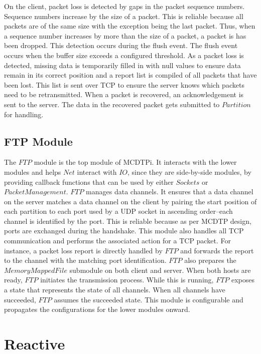 On the client, packet loss is detected by gaps in the packet sequence numbers. Sequence numbers increase by the size of a packet. This is reliable because all packets are of the same size with the exception being the last packet. Thus, when a sequence number increases by more than the size of a packet, a packet is has been dropped. This detection occurs during the flush event. The flush event occurs when the buffer size exceeds a configured threshold. As a packet loss is detected, missing data is temporarily filled in with null values to ensure data remain in its correct position and a report list is compiled of all packets that have been lost. This list is sent over TCP to ensure the server knows which packets need to be retransmitted. When a packet is recovered, an acknowledgement is sent to the server. The data in the recovered packet gets submitted to $Partition$ for handling.

\subsection{FTP Module}

The $FTP$ module is the top module of MCDTPi. It interacts with the lower modules and helps $Net$ interact with $IO$, since they are side-by-side modules, by providing callback functions that can be used by either $Sockets$ or $PacketManagement$. $FTP$ manages data channels. It ensures that a data channel on the server matches a data channel on the client by pairing the start position of each partition to each port used by a UDP socket in ascending order--each channel is identified by the port. This is reliable because as per MCDTP design, ports are exchanged during the handshake. This module also handles all TCP communication and performs the associated action for a TCP packet. For instance, a packet loss report is directly handled by $FTP$ and forwards the report to the channel with the matching port identification. $FTP$ also prepares the $MemoryMappedFile$ submodule on both client and server. When both hosts are ready, $FTP$ initiates the transmission process. While this is running, $FTP$ exposes a state that represents the state of all channels. When all channels have succeeded, $FTP$ assumes the succeeded state. This module is configurable and propagates the configurations for the lower modules onward.

\section{Reactive}\label{sec:reactive}

